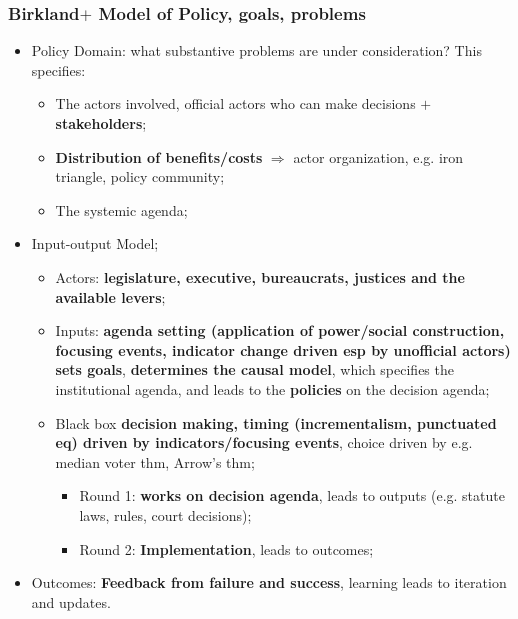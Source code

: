 \documentclass[aspectratio=169]{beamer}
\theoremstyle{principle}
\begin{document}
\begin{frame}
\frametitle{Birkland$+$ Model of Policy, goals, problems}
\begin{itemize}
\item Policy Domain: what substantive problems are under consideration?  This specifies:
\begin{itemize}
\item The actors involved, official actors who can make decisions $+$ \textbf{stakeholders}; 
\item \textbf{Distribution of benefits/costs} $\Rightarrow$ actor organization, e.g. iron triangle, policy community;
\item The systemic agenda; 
\end{itemize}
\bigskip
\item \color{black}Input-output Model;
\begin{itemize}
\item Actors: \textbf{legislature, executive, bureaucrats, justices and the available levers};
\item Inputs: \textbf{agenda setting (application of power/social construction, focusing events, indicator change driven esp by unofficial actors)} \textbf{sets goals}, \textbf{determines the causal model}, which specifies the institutional agenda, and leads to the \textbf{policies} on the decision agenda;
\item Black box \textbf{decision making, timing (incrementalism, punctuated eq) driven by indicators/focusing events}, choice driven by e.g. median voter thm, Arrow's thm;
\begin{itemize}
\item Round 1: \textbf{works on decision agenda}, leads to outputs (e.g. statute laws, rules, court decisions);
\item Round 2: \textbf{Implementation}, leads to outcomes;
 \end{itemize}
\end{itemize}
\bigskip
\item Outcomes: \textbf{Feedback from failure and success}, learning leads to iteration and updates.
\end{itemize}
\end{frame}
\end{document}

